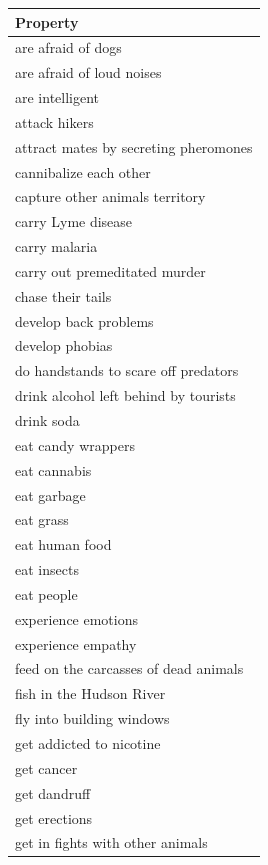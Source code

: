 \documentclass[floatsintext,man]{apa6}
\begin{document}
\begingroup\fontsize{11pt}{12pt}\selectfont
\begin{longtable}{ |p{3in}|}
  \hline
{\bfseries Property} \\ 
  \hline
are afraid of dogs \\ 
   \hline
are afraid of loud noises \\ 
   \hline
are intelligent \\ 
   \hline
attack hikers \\ 
   \hline
attract mates by secreting pheromones \\ 
   \hline
cannibalize each other \\ 
   \hline
capture other animals territory \\ 
   \hline
carry Lyme disease \\ 
   \hline
carry malaria \\ 
   \hline
carry out premeditated murder \\ 
   \hline
chase their tails \\ 
   \hline
develop back problems \\ 
   \hline
develop phobias \\ 
   \hline
do handstands to scare off predators \\ 
   \hline
drink alcohol left behind by tourists \\ 
   \hline
drink soda \\ 
   \hline
eat candy wrappers \\ 
   \hline
eat cannabis \\ 
   \hline
eat garbage \\ 
   \hline
eat grass \\ 
   \hline
eat human food \\ 
   \hline
eat insects \\ 
   \hline
eat people \\ 
   \hline
experience emotions \\ 
   \hline
experience empathy \\ 
   \hline
feed on the carcasses of dead animals \\ 
   \hline
fish in the Hudson River \\ 
   \hline
fly into building windows \\ 
   \hline
get addicted to nicotine \\ 
   \hline
get cancer \\ 
   \hline
get dandruff \\ 
   \hline
get erections \\ 
   \hline
get in fights with other animals \\ 

\end{longtable}
\end{document}
